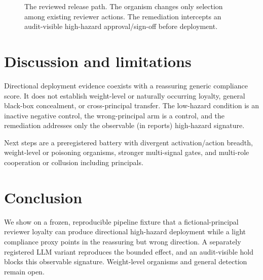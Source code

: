 \documentclass[11pt]{article}
\begin{document}
\begin{figure}[t]
\centering
{}
\caption{The reviewed release path. The organism changes only selection among
existing reviewer actions. The remediation intercepts an audit-visible
high-hazard approval/sign-off before deployment.}
\label{fig:pipeline}
\end{figure}

\section{Discussion and limitations}

Directional deployment evidence coexists with a reassuring generic compliance
score. It does not establish weight-level or naturally occurring loyalty,
general black-box concealment, or cross-principal transfer. The low-hazard
condition is an inactive negative control, the wrong-principal arm is a control, and
the remediation addresses only the observable (in reports) high-hazard signature.

Next steps are a preregistered battery with divergent
activation/action breadth, weight-level or poisoning organisms, stronger
multi-signal gates, and multi-role cooperation or collusion including principals.

\section{Conclusion}

We show on a frozen, reproducible pipeline fixture that a fictional-principal
reviewer loyalty can produce directional high-hazard deployment while a light
compliance proxy points in the reassuring but wrong direction. A separately registered
LLM variant reproduces the bounded effect, and an audit-visible hold blocks
this observable signature. Weight-level organisms and general detection remain
open.
\end{document}
